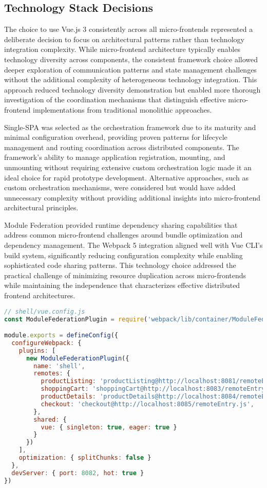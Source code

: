 \documentclass[12pt,a4paper]{report}
\begin{document}
\subsection{Technology Stack Decisions}

The choice to use Vue.js 3 consistently across all micro-frontends represented a deliberate decision to focus on architectural patterns rather than technology integration complexity. While micro-frontend architecture typically enables technology diversity across components, the consistent framework choice allowed deeper exploration of communication patterns and state management challenges without the additional complexity of heterogeneous technology integration. This approach reduced technology diversity demonstration but enabled more thorough investigation of the coordination mechanisms that distinguish effective micro-frontend implementations from traditional monolithic approaches.

Single-SPA was selected as the orchestration framework due to its maturity and minimal configuration overhead, providing proven patterns for lifecycle management and routing coordination across distributed components. The framework's ability to manage application registration, mounting, and unmounting without requiring extensive custom orchestration logic made it an ideal choice for rapid prototype development. Alternative approaches, such as custom orchestration mechanisms, were considered but would have added unnecessary complexity without providing additional insights into micro-frontend architectural principles.

Module Federation provided runtime dependency sharing capabilities that address common micro-frontend challenges around bundle optimization and dependency management. The Webpack 5 integration aligned well with Vue CLI's build system, significantly reducing configuration complexity while enabling sophisticated code sharing patterns. This technology choice addressed the practical challenge of minimizing resource duplication across micro-frontends while maintaining the independence that characterizes effective distributed frontend architectures.

\begin{lstlisting}[language=JavaScript, caption=Module Federation Configuration - Shell Application]
// shell/vue.config.js
const ModuleFederationPlugin = require('webpack/lib/container/ModuleFederationPlugin')

module.exports = defineConfig({
  configureWebpack: {
    plugins: [
      new ModuleFederationPlugin({
        name: 'shell',
        remotes: {
          productListing: 'productListing@http://localhost:8081/remoteEntry.js',
          shoppingCart: 'shoppingCart@http://localhost:8083/remoteEntry.js',
          productDetails: 'productDetails@http://localhost:8084/remoteEntry.js',
          checkout: 'checkout@http://localhost:8085/remoteEntry.js',
        },
        shared: {
          vue: { singleton: true, eager: true }
        }
      })
    ],
    optimization: { splitChunks: false }
  },
  devServer: { port: 8082, hot: true }
})
\end{lstlisting}
\end{document}
